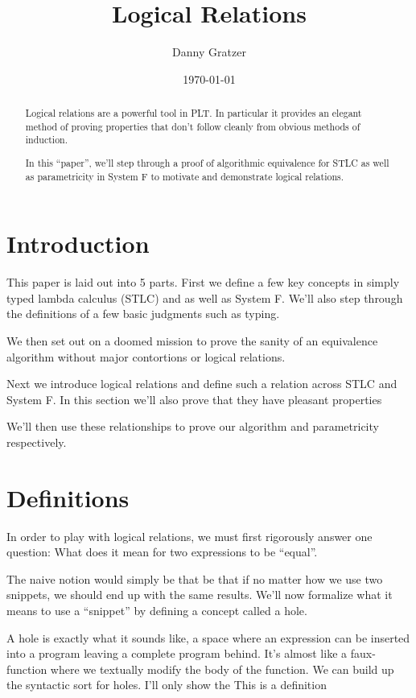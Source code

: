 \documentclass[12pt]{article}
\begin{document}
\title{Logical Relations}
\author{Danny Gratzer}
\date{\today}
\maketitle

\begin{abstract}
Logical relations are a powerful tool in PLT. In particular it
provides an elegant method of proving properties that don't follow
cleanly from obvious methods of induction.

In this ``paper'', we'll step through a proof of algorithmic
equivalence for STLC as well as parametricity in System F to motivate
and demonstrate logical relations.
\end{abstract}

\section{Introduction}
This paper is laid out into 5 parts. First we define a few key
concepts in simply typed lambda calculus (STLC) and as well as System
F. We'll also step through the definitions of a few basic judgments
such as typing.

We then set out on a doomed mission to prove the sanity of an
equivalence algorithm without major contortions or logical
relations.

Next we introduce logical relations and define such a relation across
STLC and System F. In this section we'll also prove that they have
pleasant properties

We'll then use these relationships to prove our algorithm and
parametricity respectively.

\section{Definitions}
In order to play with logical relations, we must first rigorously
answer one question: What does it mean for two expressions to be
``equal''.

The naive notion would simply be that be that if no matter how we use
two snippets, we should end up with the same results. We'll now
formalize what it means to use a ``snippet'' by defining a concept
called a hole.

A hole is exactly what it sounds like, a space where an expression can
be inserted into a program leaving a complete program behind. It's
almost like a faux-function where we textually modify the body of the
function. We can build up the syntactic sort for holes. I'll only show
the This is a definition
\end{document}
